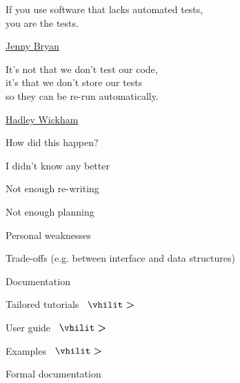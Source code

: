 \documentclass[12pt,t,aspectratio=169]{beamer}
\begin{document}
\begin{frame}[c]{}

\begin{center}
\large

If you use software that lacks automated tests, \\[2pt]
you are the tests.
\end{center}

\bigskip

\bigskip

\hfill
{\lolit
{\textendash} \href{https://twitter.com/JennyBryan}{Jenny Bryan} \hspace*{7mm}
}

\end{frame}


\begin{frame}[c]{}

\begin{center}
\large

It's not that we don't test our code, \\[2pt]
it's that we don't store our tests \\[2pt]
so they can be re-run automatically.
\end{center}

\bigskip

\bigskip

\hfill
{\lolit
{\textendash} \href{https://twitter.com/hadleywickham}{Hadley Wickham}
}

\end{frame}


\begin{frame}{How did this happen?}

  \bbi
\item I didn't know any better
\item Not enough re-writing
\item Not enough planning
\item Personal weaknesses
\item Trade-offs (e.g. between interface and data structures)
  \ei

\end{frame}




\begin{frame}{Documentation}

\bigskip \bigskip

  \large

  Tailored tutorials \ $\boldsymbol{\vhilit >}$

\bigskip

  \hspace{20mm} User guide \ $\boldsymbol{\vhilit >}$

\bigskip

  \hspace{40mm} Examples \ $\boldsymbol{\vhilit >}$

\bigskip

  \hspace{60mm} Formal documentation

\end{frame}
\end{document}
